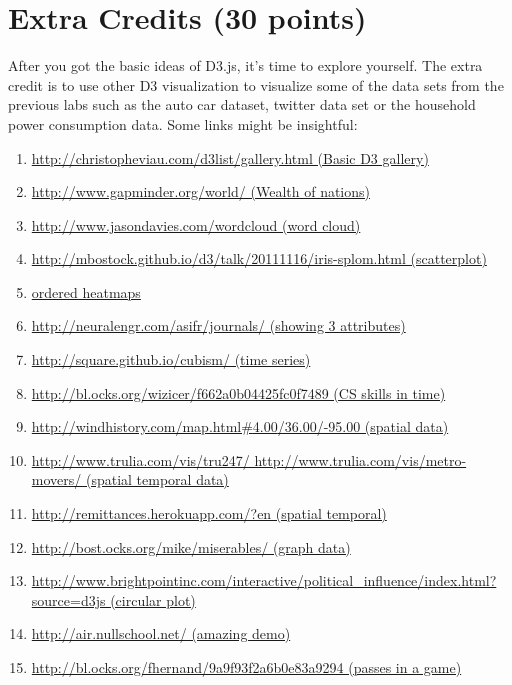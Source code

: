 \documentclass[a4paper, 11pt]{article}
\begin{document}
\section{Extra Credits (30 points)}
After you got the basic ideas of D3.js, it's time to explore yourself. The extra credit is to use other D3 visualization to visualize some of the data sets from the previous labs such as the auto car dataset, twitter data set or the household power consumption data. Some links might be insightful:
\begin{enumerate}
\item \href{http://christopheviau.com/d3list/gallery.html}{http://christopheviau.com/d3list/gallery.html (Basic D3 gallery)}
\item \href{http://www.gapminder.org/world/}{http://www.gapminder.org/world/ (Wealth of nations)}
\item \href{http://www.jasondavies.com/wordcloud}{ http://www.jasondavies.com/wordcloud (word cloud)}
\item \href{http://mbostock.github.io/d3/talk/20111116/iris-splom.html}{http://mbostock.github.io/d3/talk/20111116/iris-splom.html (scatterplot)}
\item \href{http://astro.temple.edu/~tuc17157/em_ordering/basic_v2_wave_classes_flip.html}{ ordered heatmaps}
\item \href{http://neuralengr.com/asifr/journals/} {http://neuralengr.com/asifr/journals/ (showing 3 attributes)}
\item \href{http://square.github.io/cubism/}{http://square.github.io/cubism/ (time series)}
\item \href{http://bl.ocks.org/wizicer/f662a0b04425fc0f7489}{http://bl.ocks.org/wizicer/f662a0b04425fc0f7489 (CS skills in time)}
\item \href{http://windhistory.com/map.html4.00/36.00/-95.00}{http://windhistory.com/map.html\#{4.00}/36.00/-95.00 (spatial data)}
\item \href{}{http://www.trulia.com/vis/tru247/ http://www.trulia.com/vis/metro-movers/ (spatial temporal data)}
\item \href{http://remittances.herokuapp.com/?en}{http://remittances.herokuapp.com/?en (spatial temporal)}
\item \href{http://bost.ocks.org/mike/miserables/}{http://bost.ocks.org/mike/miserables/  (graph data)}
\item \href{http://www.brightpointinc.com/interactive/political_influence/index.html?source=d3js}{http://www.brightpointinc.com/interactive/political\_influence/index.html?source=d3js (circular plot)}
\item \href{http://air.nullschool.net/}{http://air.nullschool.net/ (amazing demo)}
\item \href{http://bl.ocks.org/fhernand/9a9f93f2a6b0e83a9294}{http://bl.ocks.org/fhernand/9a9f93f2a6b0e83a9294 (passes in a game)}
\end{enumerate}
\end{document}
